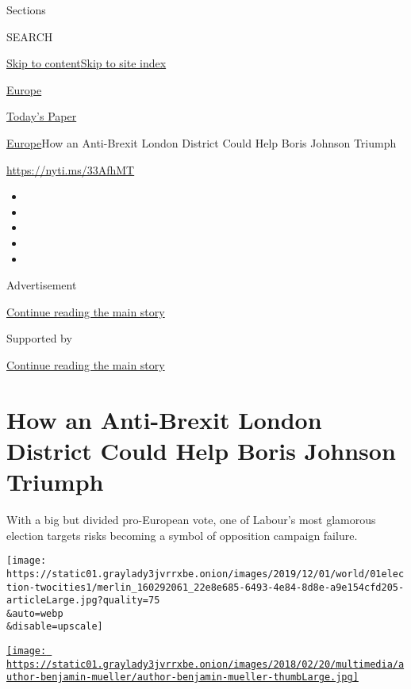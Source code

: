 Sections

SEARCH

\protect\hyperlink{site-content}{Skip to
content}\protect\hyperlink{site-index}{Skip to site index}

\href{https://www.nytimes3xbfgragh.onion/section/world/europe}{Europe}

\href{https://myaccount.nytimes3xbfgragh.onion/auth/login?response_type=cookie\&client_id=vi}{}

\href{https://www.nytimes3xbfgragh.onion/section/todayspaper}{Today's
Paper}

\href{/section/world/europe}{Europe}\textbar{}How an Anti-Brexit London
District Could Help Boris Johnson Triumph

\url{https://nyti.ms/33AfhMT}

\begin{itemize}
\item
\item
\item
\item
\item
\end{itemize}

Advertisement

\protect\hyperlink{after-top}{Continue reading the main story}

Supported by

\protect\hyperlink{after-sponsor}{Continue reading the main story}

\hypertarget{how-an-anti-brexit-london-district-could-help-boris-johnson-triumph}{%
\section{How an Anti-Brexit London District Could Help Boris Johnson
Triumph}\label{how-an-anti-brexit-london-district-could-help-boris-johnson-triumph}}

With a big but divided pro-European vote, one of Labour's most glamorous
election targets risks becoming a symbol of opposition campaign failure.

\texttt{[image: https://static01.graylady3jvrrxbe.onion/images/2019/12/01/world/01election-twocities1/merlin\_160292061\_22e8e685-6493-4e84-8d8e-a9e154cfd205-articleLarge.jpg?quality=75\\\&auto=webp\\\&disable=upscale]}

\href{https://www.nytimes3xbfgragh.onion/by/benjamin-mueller}{\texttt{[image: https://static01.graylady3jvrrxbe.onion/images/2018/02/20/multimedia/author-benjamin-mueller/author-benjamin-mueller-thumbLarge.jpg]}}


